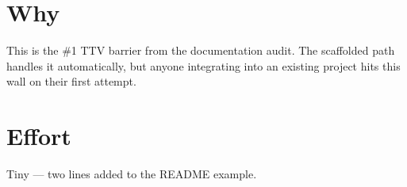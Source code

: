 \section{Why}\label{record-319-why}

This is the \#1 TTV barrier from the documentation audit. The scaffolded path handles it automatically, but anyone integrating into an existing project hits this wall on their first attempt.

\section{Effort}\label{record-319-effort}

Tiny --- two lines added to the README example.

